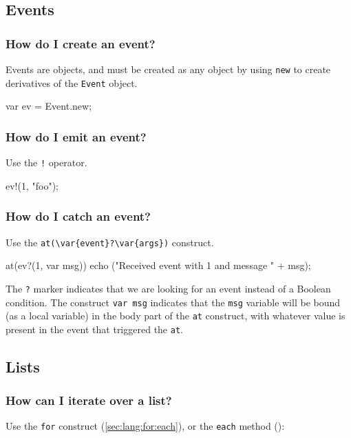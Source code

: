 \subsection{Events}
\subsubsection{How do I create an event?}
Events are objects, and must be created as any object by using
\lstinline{new} to create derivatives of the \lstinline{Event} object.

\begin{urbiunchecked}
var ev = Event.new;
\end{urbiunchecked}

\subsubsection{How do I emit an event?}
Use the \lstinline|!| operator.

\begin{urbiunchecked}
ev!(1, "foo");
\end{urbiunchecked}

\subsubsection{How do I catch an event?}
Use the \lstinline|at(\var{event}?\var{args})| construct.

\begin{urbiunchecked}
at(ev?(1, var msg))
  echo ("Received event with 1 and message " + msg);
\end{urbiunchecked}

The \lstinline{?} marker indicates that we are looking for an event
instead of a Boolean condition. The construct \lstinline{var msg}
indicates that the \lstinline{msg} variable will be bound (as a local
variable) in the body part of the \lstinline{at} construct, with
whatever value is present in the event that triggered the
\lstinline{at}.

\subsection{Lists}
\subsubsection{How can I iterate over a list?}

Use the \lstinline{for} construct (\autoref{sec:lang:for:each}), or
the \lstinline|each| method ():

